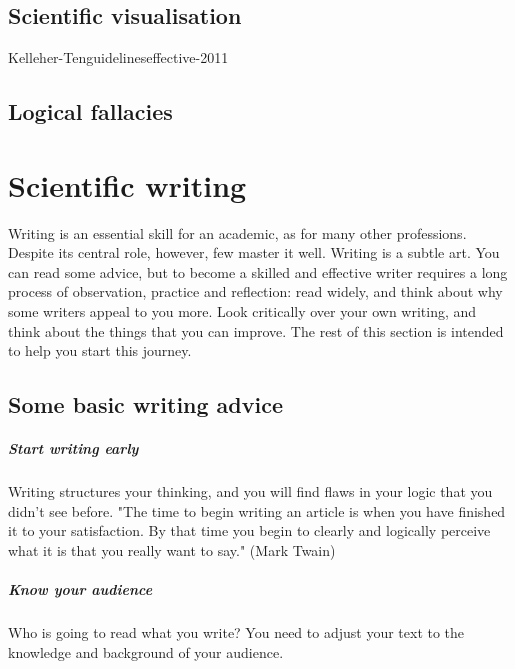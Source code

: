 \documentclass{tufte-book}
\begin{document}
\section{Scientific visualisation}


Kelleher-Tenguidelineseffective-2011

\section{Logical fallacies}



\chapter{Scientific writing}


Writing is an essential skill for an academic, as for many other professions.  Despite its central role, however, few master it well. Writing is a subtle art. You can read some advice, but to become a skilled and effective writer requires a long process of observation, practice and reflection: read widely, and think about why some writers appeal to you more. Look critically over your own writing, and think about the things that you can improve. The rest of this section is intended to help you start this journey. 

\section{Some basic writing advice}

\paragraph{Start writing early} Writing structures your thinking, and you will find flaws in your logic that you didn't see before. "The time to begin writing an article is when you have finished it to your satisfaction. By that time you begin to clearly and logically perceive what it is that you really want to say." (Mark Twain)

\paragraph{Know your audience} Who is going to read what you write?  You need to adjust your text to the knowledge and background of your audience. 
\end{document}
